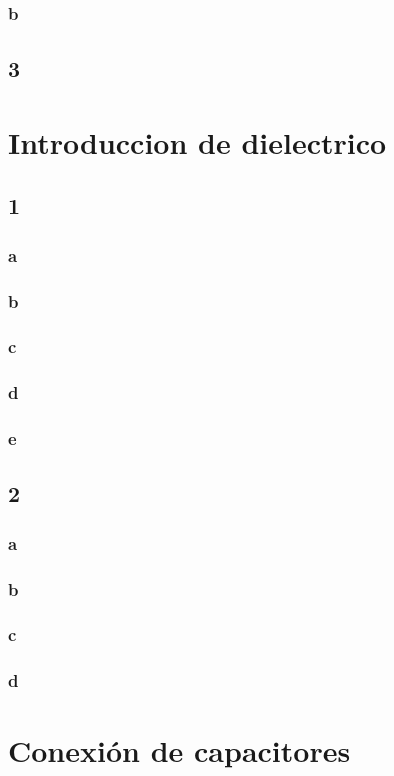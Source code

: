 \documentclass[12pt]{report}
\begin{document}
\subsection{b}
\section{3}

\chapter{Introduccion de dielectrico}
\section{1}
\subsection{a}
\subsection{b}
\subsection{c}
\subsection{d}
\subsection{e}

\section{2}
\subsection{a}
\subsection{b}
\subsection{c}
\subsection{d}

\chapter{Conexión de capacitores}
\end{document}
